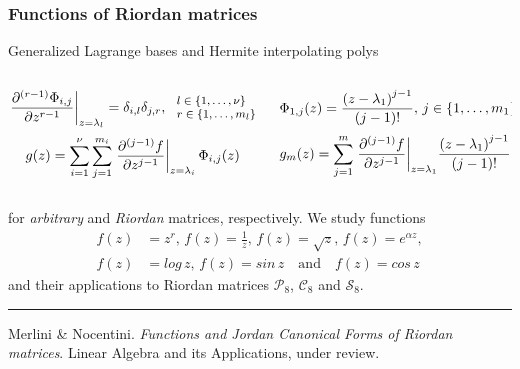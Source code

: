 \documentclass[9pt]{beamer}
\begin{document}
\begin{frame}[fragile]
\frametitle{Functions of Riordan matrices}
Generalized Lagrange bases and Hermite interpolating polys
\begin{columns}
    \begin{column}{0.5\textwidth}
        \begin{displaymath}
        \footnotesize
        \left. \frac{\partial^{(r-1)}{\Phi_{i,j}}}{\partial{z}^{r-1}} \right|_{z=\lambda_{l}} = \delta_{i,l}\delta_{j,r},
        \, 
        \begin{array}{l} 
            l\in \lbrace 1, \ldots, \nu \rbrace \\
            r \in \lbrace 1, \ldots, m_{l} \rbrace
        \end{array}
        \end{displaymath}
        \begin{displaymath}
        \footnotesize
        g(z) = \sum_{i=1}^{\nu}{\sum_{j=1}^{m_{i}}{ \left.
        \frac{\partial^{(j-1)}{f}}{\partial{z}^{j-1}} \right|_{z=\lambda_{i}}\Phi_{i,j}(z) }}
        \end{displaymath}
    \end{column}
    \vrule{}
    \begin{column}{0.5\textwidth}
        \begin{displaymath}
        \footnotesize
          \Phi_{1,j}(z) = \frac{\left(z-\lambda_{1}\right)^{j-1}}{(j-1)!}, 
          \, j\in \lbrace 1,\ldots, m_{1} \rbrace
        \end{displaymath}
        \begin{displaymath}
        \footnotesize
        g_{m}(z) = {\sum_{j=1}^{m}{ \left.
        \frac{\partial^{(j-1)}{f}}{\partial{z}^{j-1}} \right|_{z=\lambda_{1}}}}
        \frac{\left(z-\lambda_{1}\right)^{j-1}}{(j-1)!}
        \end{displaymath}
    \end{column}
\end{columns}
for \textit{arbitrary} and \textit{Riordan} matrices, respectively.
We study functions
\begin{displaymath}
\begin{split}
f(z)&=z^{r},\,{f(z)=\frac{1}{z}},\,{f(z)=\sqrt{z}},\,{f(z)=e^{\alpha z}},\\
f(z)&=log\,{z},\,f(z)=sin\,{z}\quad\text{and}\quad f(z)=cos\,{z}
\end{split}
\end{displaymath}
and their applications to Riordan matrices $\mathcal{P}_{8}$, $\mathcal{C}_{8}$
and $\mathcal{S}_{8}$.
\vfill
\noindent\rule{\textwidth}{0.1pt}
{\footnotesize
Merlini \& Nocentini. \textit{Functions and Jordan Canonical Forms of Riordan
matrices}. \newline Linear Algebra and its Applications, under review.}
\end{frame}
\end{document}
